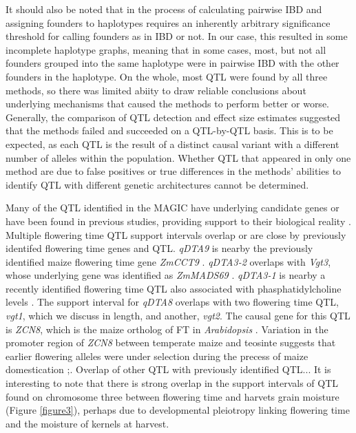 \documentclass[article,9pt,twocolumn,twoside]{rilabRxiv}
\begin{document}
It should also be noted that in the process of calculating pairwise IBD and assigning founders to haplotypes requires an inherently arbitrary significance threshold for calling founders as in IBD or not.
In our case, this resulted in some incomplete haplotype graphs, meaning that in some cases, most, but not all founders grouped into the same haplotype were in pairwise IBD with the other founders in the haplotype.
On the whole, most QTL were found by all three methods, so there was limited abiity to draw reliable conclusions about underlying mechanisms that caused the methods to perform better or worse.
Generally, the comparison of QTL detection and effect size estimates suggested that the methods failed and succeeded on a QTL-by-QTL basis.
This is to be expected, as each QTL is the result of a distinct causal variant with a different number of alleles within the population.
Whether QTL that appeared in only one method are due to false positives or true differences in the methods' abilities to identify QTL with different genetic architectures cannot be determined.

Many of the QTL identified in the MAGIC have underlying candidate genes or have been found in previous studies, providing support to their biological reality .
Multiple flowering time QTL support intervals overlap or are close by previously identifed flowering time genes and QTL.
\emph{qDTA9} is nearby the previously identified maize flowering time gene \emph{ZmCCT9} \cite{Huang3}.
\emph{qDTA3-2} overlaps with \emph{Vgt3}, whose underlying gene was identified as \emph{ZmMADS69} \cite{Liang}.
\emph{qDTA3-1} is nearby a recently identified flowering time QTL also associated with phasphatidylcholine levels \cite{RodriguezZapata}.
The support interval for \emph{qDTA8} overlaps with two flowering time QTL, \emph{vgt1}, which we discuss in length, and another, \emph{vgt2}. The causal gene for this QTL is \emph{ZCN8}, which is the maize ortholog of FT in \emph{Arabidopsis} \cite{Lazakis}.
Variation in the promoter region of \emph{ZCN8} between temperate maize and teosinte suggests that earlier flowering alleles were under selection during the precess of maize domestication \citep{Guo};\citep{Bouchet}.
Overlap of other QTL with previously identified QTL...
It is interesting to note that there is strong overlap in the support intervals of QTL found on chromosome three between flowering time and harvets grain moisture (Figure \ref{figure3}), perhaps due to developmental pleiotropy linking flowering time and the moisture of kernels at harvest.
\end{document}
